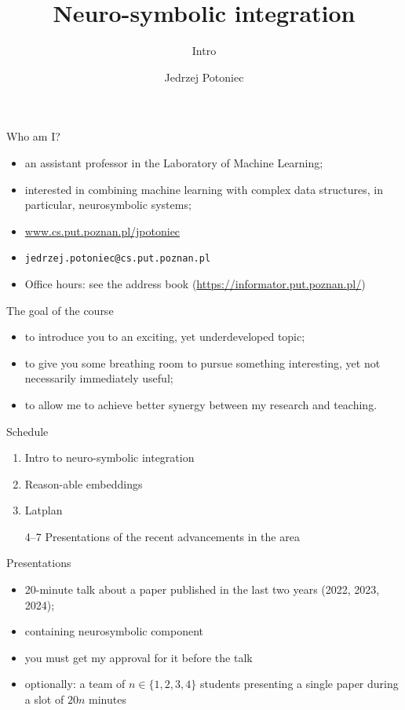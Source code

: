\documentclass{lecture}
\title{Neuro-symbolic integration}
\subtitle{Intro}
\author{Jedrzej Potoniec}
\begin{document}
\frame{\titlepage}

\begin{frame}{Who am I?}
\begin{itemize}
\item an assistant professor in the Laboratory of Machine Learning;
\item interested in combining machine learning with complex data structures, in particular, neurosymbolic systems;
\item \url{www.cs.put.poznan.pl/jpotoniec}
\item \texttt{jedrzej.potoniec@cs.put.poznan.pl}
\item Office hours: see the address book (\url{https://informator.put.poznan.pl/})
\end{itemize}
\end{frame}

\begin{frame}{The goal of the course}
    \begin{itemize}
        \item to introduce you to an exciting, yet underdeveloped topic;
        \item to give you some breathing room to pursue something interesting, yet not necessarily immediately useful;
        \item to allow me to achieve better synergy between my research and teaching.
    \end{itemize}
\end{frame}

\begin{frame}{Schedule}
    \begin{enumerate}
        \item Intro to neuro-symbolic integration
        \item Reason-able embeddings
        \item Latplan        
        \item[4--7] Presentations of the recent advancements in the area
    \end{enumerate}
\end{frame}

\begin{frame}{Presentations}
    \begin{itemize}
        \item 20-minute talk about a paper published in the last two years (2022, 2023, 2024);
        \item containing neurosymbolic component
        \item you must get my approval for it \alert{before the talk}
        \item optionally: a team of $n\in\{1,2,3,4\}$ students presenting a single paper during a slot of $20n$ minutes        
    \end{itemize}
\end{frame}
\end{document}
